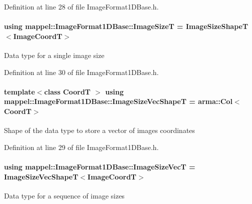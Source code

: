 Definition at line 28 of file Image\+Format1\+D\+Base.\+h.

\paragraph[{\texorpdfstring{Image\+SizeT}{ImageSizeT}}]{\setlength{\rightskip}{0pt plus 5cm}using {\bf mappel\+::\+Image\+Format1\+D\+Base\+::\+Image\+SizeT} =  {\bf Image\+Size\+ShapeT}$<${\bf Image\+CoordT}$>$\hspace{0.3cm}{\ttfamily [inherited]}}\hypertarget{classmappel_1_1ImageFormat1DBase_a6456bab2b26702022ee32ae19e90dcac}{}\label{classmappel_1_1ImageFormat1DBase_a6456bab2b26702022ee32ae19e90dcac}
Data type for a single image size 

Definition at line 30 of file Image\+Format1\+D\+Base.\+h.

\paragraph[{\texorpdfstring{Image\+Size\+Vec\+ShapeT}{ImageSizeVecShapeT}}]{\setlength{\rightskip}{0pt plus 5cm}template$<$class CoordT $>$ using {\bf mappel\+::\+Image\+Format1\+D\+Base\+::\+Image\+Size\+Vec\+ShapeT} =  arma\+::\+Col$<$CoordT$>$\hspace{0.3cm}{\ttfamily [inherited]}}\hypertarget{classmappel_1_1ImageFormat1DBase_a3c584ee68fa44dc10de2edbc3d9882bb}{}\label{classmappel_1_1ImageFormat1DBase_a3c584ee68fa44dc10de2edbc3d9882bb}
Shape of the data type to store a vector of image\textquotesingle{}s coordinates 

Definition at line 29 of file Image\+Format1\+D\+Base.\+h.

\paragraph[{\texorpdfstring{Image\+Size\+VecT}{ImageSizeVecT}}]{\setlength{\rightskip}{0pt plus 5cm}using {\bf mappel\+::\+Image\+Format1\+D\+Base\+::\+Image\+Size\+VecT} =  {\bf Image\+Size\+Vec\+ShapeT}$<${\bf Image\+CoordT}$>$\hspace{0.3cm}{\ttfamily [inherited]}}\hypertarget{classmappel_1_1ImageFormat1DBase_a5114a360a9bfcc4b5bc498c4600452f7}{}\label{classmappel_1_1ImageFormat1DBase_a5114a360a9bfcc4b5bc498c4600452f7}
Data type for a sequence of image sizes 


